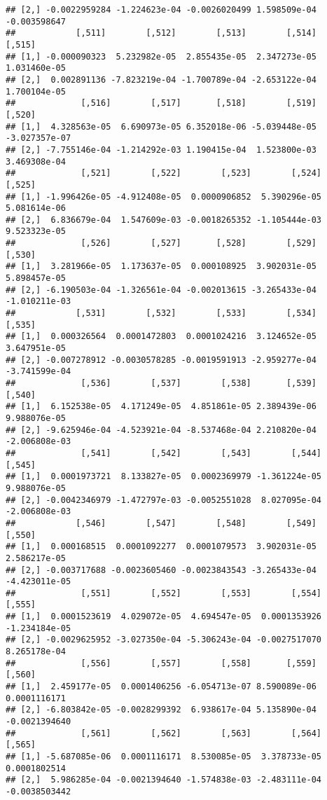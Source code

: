 \documentclass[
]{article}
\begin{document}
\begin{verbatim}
## [2,] -0.0022959284 -1.224623e-04 -0.0026020499 1.598509e-04 -0.003598647
##            [,511]        [,512]        [,513]        [,514]       [,515]
## [1,] -0.000090323  5.232982e-05  2.855435e-05  2.347273e-05 1.031460e-05
## [2,]  0.002891136 -7.823219e-04 -1.700789e-04 -2.653122e-04 1.700104e-05
##             [,516]        [,517]       [,518]        [,519]        [,520]
## [1,]  4.328563e-05  6.690973e-05 6.352018e-06 -5.039448e-05 -3.027357e-07
## [2,] -7.755146e-04 -1.214292e-03 1.190415e-04  1.523800e-03  3.469308e-04
##             [,521]        [,522]        [,523]        [,524]       [,525]
## [1,] -1.996426e-05 -4.912408e-05  0.0000906852  5.390296e-05 5.081614e-06
## [2,]  6.836679e-04  1.547609e-03 -0.0018265352 -1.105444e-03 9.523323e-05
##             [,526]        [,527]       [,528]        [,529]        [,530]
## [1,]  3.281966e-05  1.173637e-05  0.000108925  3.902031e-05  5.898457e-05
## [2,] -6.190503e-04 -1.326561e-04 -0.002013615 -3.265433e-04 -1.010211e-03
##            [,531]        [,532]        [,533]        [,534]        [,535]
## [1,]  0.000326564  0.0001472803  0.0001024216  3.124652e-05  3.647951e-05
## [2,] -0.007278912 -0.0030578285 -0.0019591913 -2.959277e-04 -3.741599e-04
##             [,536]        [,537]        [,538]       [,539]        [,540]
## [1,]  6.152538e-05  4.171249e-05  4.851861e-05 2.389439e-06  9.988076e-05
## [2,] -9.625946e-04 -4.523921e-04 -8.537468e-04 2.210820e-04 -2.006808e-03
##             [,541]        [,542]        [,543]        [,544]        [,545]
## [1,]  0.0001973721  8.133827e-05  0.0002369979 -1.361224e-05  9.988076e-05
## [2,] -0.0042346979 -1.472797e-03 -0.0052551028  8.027095e-04 -2.006808e-03
##            [,546]        [,547]        [,548]        [,549]        [,550]
## [1,]  0.000168515  0.0001092277  0.0001079573  3.902031e-05  2.586217e-05
## [2,] -0.003717688 -0.0023605460 -0.0023843543 -3.265433e-04 -4.423011e-05
##             [,551]        [,552]        [,553]        [,554]        [,555]
## [1,]  0.0001523619  4.029072e-05  4.694547e-05  0.0001353926 -1.234184e-05
## [2,] -0.0029625952 -3.027350e-04 -5.306243e-04 -0.0027517070  8.265178e-04
##             [,556]        [,557]        [,558]       [,559]        [,560]
## [1,]  2.459177e-05  0.0001406256 -6.054713e-07 8.590089e-06  0.0001116171
## [2,] -6.803842e-05 -0.0028299392  6.938617e-04 5.135890e-04 -0.0021394640
##             [,561]        [,562]        [,563]        [,564]        [,565]
## [1,] -5.687085e-06  0.0001116171  8.530085e-05  3.378733e-05  0.0001802514
## [2,]  5.986285e-04 -0.0021394640 -1.574838e-03 -2.483111e-04 -0.0038503442

\end{verbatim}
\end{document}
